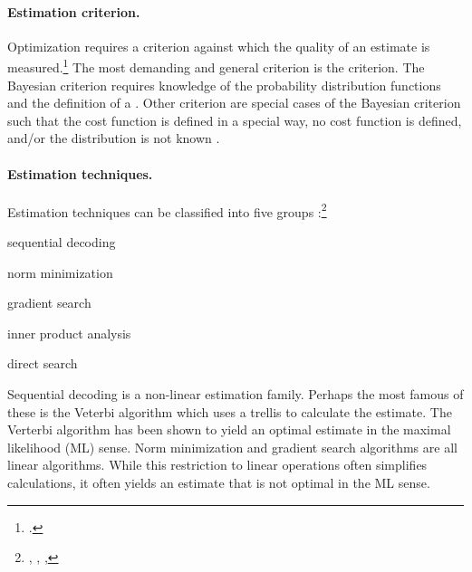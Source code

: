 \paragraph{Estimation criterion.}
Optimization requires a criterion against which the quality of an
estimate is measured.\footnote{.}
The most demanding and general criterion is the  criterion.
The Bayesian criterion requires knowledge of the probability
distribution functions and the definition of a .
Other criterion are special cases of the Bayesian criterion
such that the cost function is defined in a special way,
no cost function is defined, and/or the distribution is not known
.

\paragraph{Estimation techniques.}
\label{ref:sec:parameter-est}
Estimation techniques can be classified into
five groups :\footnote{%
  ,
  ,
  ,
  }
\begin{enume}
   \item sequential decoding
   \item norm minimization
   \item gradient search
   \item inner product analysis
   \item direct search
\end{enume}

Sequential decoding is a non-linear estimation family.
Perhaps the most famous of these is the Veterbi algorithm which
uses a trellis to calculate the estimate.
The Verterbi algorithm has been shown to yield an optimal estimate
in the maximal likelihood (ML) sense.
Norm minimization and gradient search algorithms are all linear algorithms.
While this restriction to linear operations often simplifies calculations,
it often yields an estimate that is not optimal in the ML sense.

